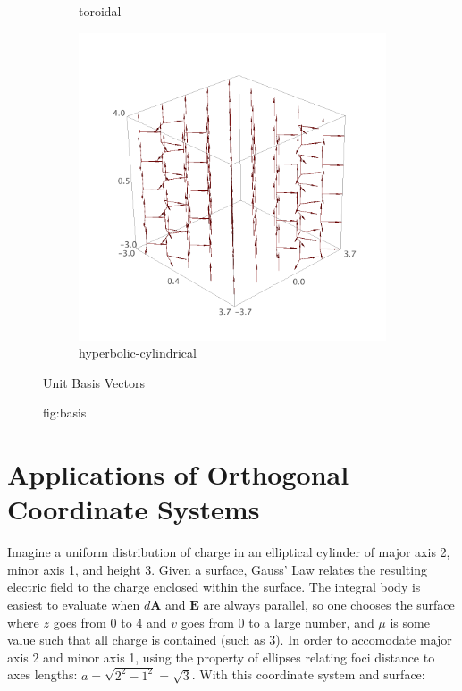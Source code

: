 \documentclass{article}
\begin{document}
\begin{figure}
\begin{subfigure}[b]{0.3\textwidth}
        \caption{toroidal}
    \end{subfigure}
    \begin{subfigure}[b]{0.3\textwidth}
        \includegraphics[width=\textwidth]{images/hyperbolic_bases.png}
        \caption{hyperbolic-cylindrical}
    \end{subfigure}
\caption{Unit Basis Vectors}
\caption{fig:basis}
\end{figure}


\section*{Applications of Orthogonal Coordinate Systems}
\label{sec:convenient}

Imagine a uniform distribution of charge in an elliptical cylinder of major axis 2, minor axis 1, and height 3. Given a surface, Gauss' Law relates the resulting electric field to the charge enclosed within the surface. The integral body is easiest to evaluate when $d \textbf{A}$ and $\textbf{E}$ are always parallel, so one chooses the surface where $z$ goes from 0 to 4 and $v$ goes from 0 to a large number, and $\mu$ is some value such that all charge is contained (such as 3). In order to accomodate major axis 2 and minor axis 1, using the property of ellipses relating foci distance to axes lengths: $a = \sqrt{2^2 - 1^2} = \sqrt{3}$. With this coordinate system and surface:
\end{document}

